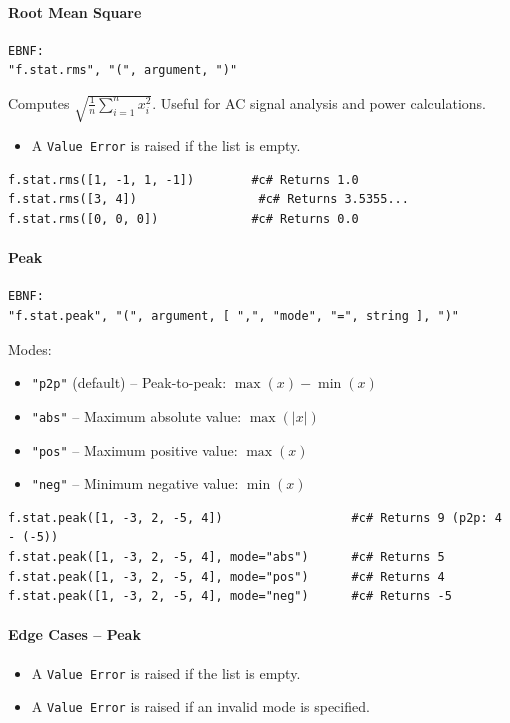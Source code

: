 \paragraph{Root Mean Square}
\begin{verbatim}
EBNF:
"f.stat.rms", "(", argument, ")"
\end{verbatim}
Computes $\sqrt{\frac{1}{n}\sum_{i=1}^{n} x_i^2}$. Useful for AC signal analysis and power calculations.
\begin{itemize}
\item A \texttt{Value Error} is raised if the list is empty.
\end{itemize}
\begin{verbatim}
f.stat.rms([1, -1, 1, -1])        #c# Returns 1.0
f.stat.rms([3, 4])                 #c# Returns 3.5355...
f.stat.rms([0, 0, 0])             #c# Returns 0.0
\end{verbatim}

\paragraph{Peak}
\begin{verbatim}
EBNF:
"f.stat.peak", "(", argument, [ ",", "mode", "=", string ], ")"
\end{verbatim}
Modes:
\begin{itemize}
\item \texttt{"p2p"} (default) -- Peak-to-peak: $\max(x) - \min(x)$
\item \texttt{"abs"} -- Maximum absolute value: $\max(|x|)$
\item \texttt{"pos"} -- Maximum positive value: $\max(x)$
\item \texttt{"neg"} -- Minimum negative value: $\min(x)$
\end{itemize}
\begin{verbatim}
f.stat.peak([1, -3, 2, -5, 4])                  #c# Returns 9 (p2p: 4 - (-5))
f.stat.peak([1, -3, 2, -5, 4], mode="abs")      #c# Returns 5
f.stat.peak([1, -3, 2, -5, 4], mode="pos")      #c# Returns 4
f.stat.peak([1, -3, 2, -5, 4], mode="neg")      #c# Returns -5
\end{verbatim}

\paragraph{Edge Cases -- Peak}
\begin{itemize}
\item A \texttt{Value Error} is raised if the list is empty.
\item A \texttt{Value Error} is raised if an invalid mode is specified.
\end{itemize}

